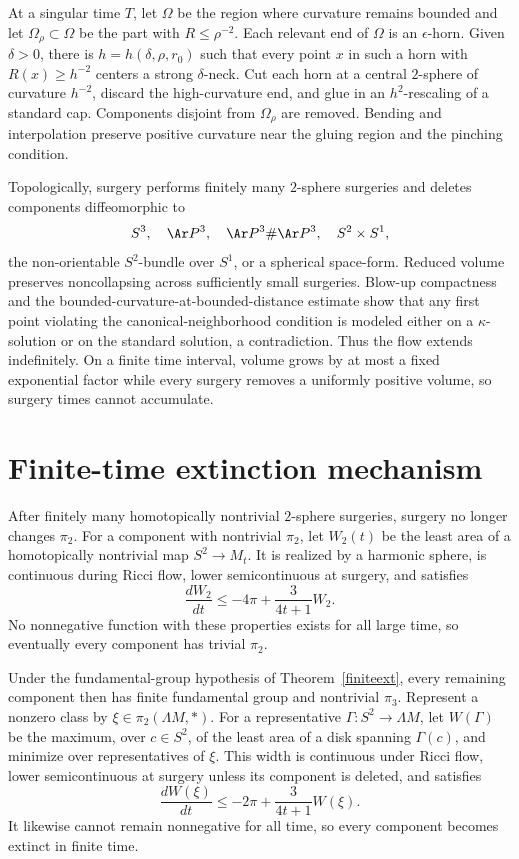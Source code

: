 At a singular time $T$, let $\Omega$ be the region where curvature remains
bounded and let $\Omega_\rho\subset\Omega$ be the part with
$R\leq\rho^{-2}$. Each relevant end of $\Omega$ is an $\epsilon$-horn. Given
$\delta>0$, there is $h=h(\delta,\rho,r_0)$ such that every point $x$ in such
a horn with $R(x)\geq h^{-2}$ centers a strong $\delta$-neck. Cut each horn at
a central $2$-sphere of curvature $h^{-2}$, discard the high-curvature end,
and glue in an $h^2$-rescaling of a standard cap. Components disjoint from
$\Omega_\rho$ are removed. Bending and interpolation preserve positive
curvature near the gluing region and the pinching condition.

Topologically, surgery performs finitely many $2$-sphere surgeries and deletes
components diffeomorphic to
\[
  S^3,\quad \Ar P^3,\quad \Ar P^3\#\Ar P^3,\quad S^2\times S^1,
\]
the non-orientable $S^2$-bundle over $S^1$, or a spherical space-form. Reduced
volume preserves noncollapsing across sufficiently small surgeries.
Blow-up compactness and the bounded-curvature-at-bounded-distance estimate
show that any first point violating the canonical-neighborhood condition is
modeled either on a $\kappa$-solution or on the standard solution, a
contradiction. Thus the flow extends indefinitely. On a finite time interval,
volume grows by at most a fixed exponential factor while every surgery removes
a uniformly positive volume, so surgery times cannot accumulate.

\section{Finite-time extinction mechanism}

After finitely many homotopically nontrivial $2$-sphere surgeries, surgery no
longer changes $\pi_2$. For a component with nontrivial $\pi_2$, let $W_2(t)$
be the least area of a homotopically nontrivial map $S^2\to M_t$. It is
realized by a harmonic sphere, is continuous during Ricci flow, lower
semicontinuous at surgery, and satisfies
\[
  \frac{dW_2}{dt}\leq-4\pi+\frac{3}{4t+1}W_2.
\]
No nonnegative function with these properties exists for all large time, so
eventually every component has trivial $\pi_2$.

Under the fundamental-group hypothesis of
Theorem~\ref{finiteext}, every remaining component then has finite fundamental
group and nontrivial $\pi_3$. Represent a nonzero class by
$\xi\in\pi_2(\Lambda M,*)$. For a representative
$\Gamma:S^2\to\Lambda M$, let $W(\Gamma)$ be the maximum, over
$c\in S^2$, of the least area of a disk spanning $\Gamma(c)$, and minimize
over representatives of $\xi$. This width is continuous under Ricci flow,
lower semicontinuous at surgery unless its component is deleted, and satisfies
\[
  \frac{dW(\xi)}{dt}\leq-2\pi+\frac{3}{4t+1}W(\xi).
\]
It likewise cannot remain nonnegative for all time, so every component becomes
extinct in finite time.
